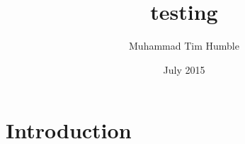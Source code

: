 \documentclass{book}
\title{testing}
\author{Muhammad Tim Humble}
\date{July 2015}
\begin{document}
\maketitle

\section{Introduction}
\end{document}
